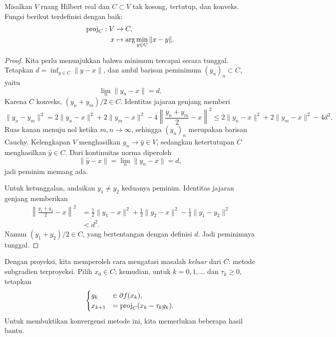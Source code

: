 \begin{theorem}
    Misalkan \(V\) ruang Hilbert real dan \(C\subset V\) tak kosong, tertutup, dan konveks. Fungsi berikut terdefinisi dengan baik:
    \begin{equation}
        \begin{aligned}
            \mathrm{proj}_C:V&\rightarrow C,\\
            x&\mapsto\arg\min_{y\in C}\|x-y\|.
        \end{aligned}
    \end{equation}
\end{theorem}
\begin{proof}
    Kita perlu menunjukkan bahwa minimum tercapai secara tunggal. Tetapkan
    \(d=\inf_{y\in C}\|y-x\|\), dan ambil barisan peminimum \((y_n)_n\subset C\), yaitu
    \begin{equation}
        \lim_n \|y_n-x\| = d.
    \end{equation}
    Karena \(C\) konveks, \((y_n+y_m)/2\in C\). Identitas jajaran genjang memberi
    \[
        \|y_n-y_m\|^2
        =2\|y_n-x\|^2+2\|y_m-x\|^2
        -4\left\|\frac{y_n+y_m}{2}-x\right\|^2
        \leq 2\|y_n-x\|^2+2\|y_m-x\|^2-4d^2.
    \]
    Ruas kanan menuju nol ketika \(m,n\rightarrow\infty\), sehingga \((y_n)_n\) merupakan barisan Cauchy. Kelengkapan \(V\) menghasilkan \(y_n\rightarrow\widehat y\in V\), sedangkan ketertutupan \(C\) menghasilkan \(\widehat y\in C\). Dari kontinuitas norma diperoleh
    \begin{equation}
        \|\widehat y-x\| = \lim_n \|y_n-x\| = d,
    \end{equation}
    jadi peminim memang ada.

    Untuk ketunggalan, andaikan \(y_1\neq y_2\) keduanya peminim. Identitas jajaran genjang memberikan
    \begin{equation}
        \begin{aligned}
            \left\|\frac{y_1+y_2}{2}-x\right\|^2
            &=\frac{1}{2}\|y_1-x\|^2+\frac{1}{2}\|y_2-x\|^2
              -\frac{1}{4}\|y_1-y_2\|^2\\
            &<d^2.
        \end{aligned}
    \end{equation}
    Namun \((y_1+y_2)/2\in C\), yang bertentangan dengan definisi \(d\). Jadi peminimnya tunggal.
\end{proof}

Dengan proyeksi, kita memperoleh cara mengatasi masalah \emph{keluar} dari \(C\): metode subgradien terproyeksi. Pilih \(x_0\in C\); kemudian, untuk \(k=0,1,\dots\) dan \(\tau_k\geq0\), tetapkan
\begin{equation}\label{subgradient:eq:projectedSG}
    \begin{cases}
        g_k &\in \partial f(x_k),\\
        x_{k+1} &= \mathrm{proj}_C( x_k-\tau_k g_k) .
    \end{cases}
\end{equation}
Untuk membuktikan konvergensi metode ini, kita memerlukan beberapa hasil bantu.

